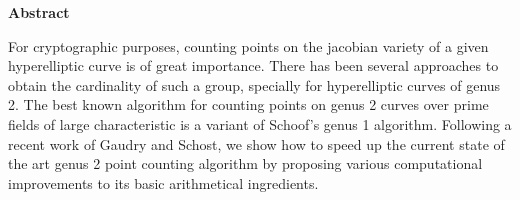 
\vspace*{2in}
\begin{center}
\large
\textbf{Abstract}
\normalsize
\end{center}

For cryptographic purposes, counting points on the jacobian variety of a given hyperelliptic curve 
is of great importance. There has been several approaches to obtain the cardinality of such a group, 
specially for hyperelliptic curves of genus 2. The best known algorithm for counting points on genus 
2 curves over prime fields of large characteristic is a variant of Schoof's genus 1 algorithm. 
Following a recent work of Gaudry and Schost, we show how to speed up the current state of the art 
genus 2 point counting algorithm by proposing various computational improvements to its basic 
arithmetical ingredients.


